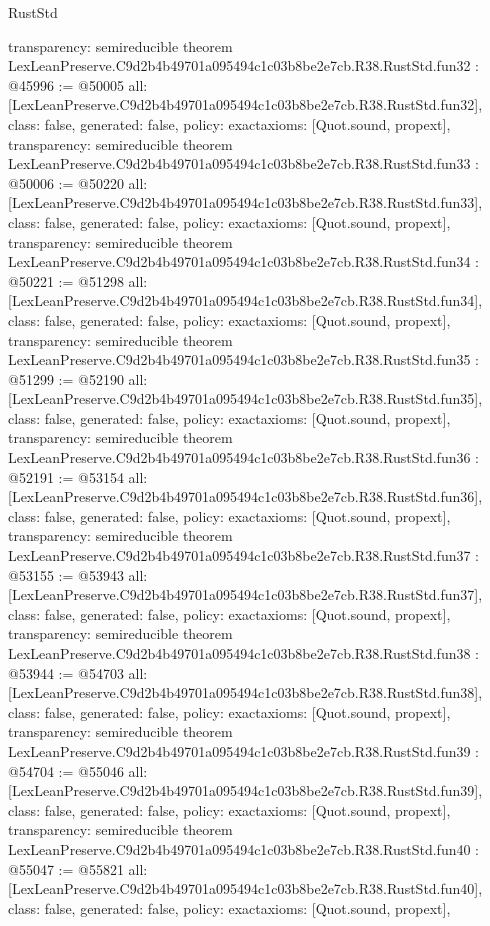\begin{lexlean}{RustStd}
\begin{coremodule}
{  transparency: semireducible
}
theorem LexLeanPreserve.C9d2b4b49701a095494c1c03b8be2e7cb.R38.RustStd.fun32 : @45996 := @50005 {
  all: [LexLeanPreserve.C9d2b4b49701a095494c1c03b8be2e7cb.R38.RustStd.fun32],
  class: false,
  generated: false,
  policy: exact{axioms: [Quot.sound, propext]},
  transparency: semireducible
}
theorem LexLeanPreserve.C9d2b4b49701a095494c1c03b8be2e7cb.R38.RustStd.fun33 : @50006 := @50220 {
  all: [LexLeanPreserve.C9d2b4b49701a095494c1c03b8be2e7cb.R38.RustStd.fun33],
  class: false,
  generated: false,
  policy: exact{axioms: [Quot.sound, propext]},
  transparency: semireducible
}
theorem LexLeanPreserve.C9d2b4b49701a095494c1c03b8be2e7cb.R38.RustStd.fun34 : @50221 := @51298 {
  all: [LexLeanPreserve.C9d2b4b49701a095494c1c03b8be2e7cb.R38.RustStd.fun34],
  class: false,
  generated: false,
  policy: exact{axioms: [Quot.sound, propext]},
  transparency: semireducible
}
theorem LexLeanPreserve.C9d2b4b49701a095494c1c03b8be2e7cb.R38.RustStd.fun35 : @51299 := @52190 {
  all: [LexLeanPreserve.C9d2b4b49701a095494c1c03b8be2e7cb.R38.RustStd.fun35],
  class: false,
  generated: false,
  policy: exact{axioms: [Quot.sound, propext]},
  transparency: semireducible
}
theorem LexLeanPreserve.C9d2b4b49701a095494c1c03b8be2e7cb.R38.RustStd.fun36 : @52191 := @53154 {
  all: [LexLeanPreserve.C9d2b4b49701a095494c1c03b8be2e7cb.R38.RustStd.fun36],
  class: false,
  generated: false,
  policy: exact{axioms: [Quot.sound, propext]},
  transparency: semireducible
}
theorem LexLeanPreserve.C9d2b4b49701a095494c1c03b8be2e7cb.R38.RustStd.fun37 : @53155 := @53943 {
  all: [LexLeanPreserve.C9d2b4b49701a095494c1c03b8be2e7cb.R38.RustStd.fun37],
  class: false,
  generated: false,
  policy: exact{axioms: [Quot.sound, propext]},
  transparency: semireducible
}
theorem LexLeanPreserve.C9d2b4b49701a095494c1c03b8be2e7cb.R38.RustStd.fun38 : @53944 := @54703 {
  all: [LexLeanPreserve.C9d2b4b49701a095494c1c03b8be2e7cb.R38.RustStd.fun38],
  class: false,
  generated: false,
  policy: exact{axioms: [Quot.sound, propext]},
  transparency: semireducible
}
theorem LexLeanPreserve.C9d2b4b49701a095494c1c03b8be2e7cb.R38.RustStd.fun39 : @54704 := @55046 {
  all: [LexLeanPreserve.C9d2b4b49701a095494c1c03b8be2e7cb.R38.RustStd.fun39],
  class: false,
  generated: false,
  policy: exact{axioms: [Quot.sound, propext]},
  transparency: semireducible
}
theorem LexLeanPreserve.C9d2b4b49701a095494c1c03b8be2e7cb.R38.RustStd.fun40 : @55047 := @55821 {
  all: [LexLeanPreserve.C9d2b4b49701a095494c1c03b8be2e7cb.R38.RustStd.fun40],
  class: false,
  generated: false,
  policy: exact{axioms: [Quot.sound, propext]},
}
\end{coremodule}
\end{lexlean}
